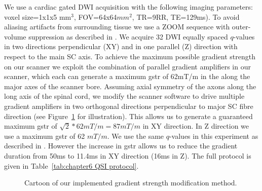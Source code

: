 We use a cardiac gated \gls{DWI} acquisition with the following imaging parameters: voxel size=1x1x5 mm$^3$, FOV=64x64$mm^2$, TR=9RR, TE=129ms). To avoid aliasing artifacts from surrounding tissue we use a ZOOM sequence with outer-volume suppression as described in \citep{Wilm:2007}. We acquire 32 \gls{DWI} equally spaced $q$-values in two directions perpendicular (XY) and in one parallel (Z) direction with respect to the main {\gls{SC}} axis. To achieve the maximum possible gradient strength on our scanner we exploit the combination of parallel gradient amplifiers in our scanner, which each can generate a maximum \gls{gstr} of 62mT/m in the along the major axes of the scanner bore. Assuming axial symmetry of the axons along the long axis of the spinal cord, we modify the scanner software to drive multiple gradient amplifiers in two orthogonal directions perpendicular to major SC fibre direction (see Figure~\ref{fig:chapter5_exp2_overplus_cartoon} for illustration). This allows us to generate a guaranteed maximum \gls{gstr} of $\sqrt{2} * 62mT/m = 87mT/m$ in XY direction.  In Z direction we use a maximum \gls{gstr} of 62 $mT/m$. We use the same $q$-values in this experiment as described in \citet{Farrell:2008}. However the increase in \gls{gstr} allows us to reduce the gradient duration from 50ms to 11.4ms in XY direction (16ms in Z). The full protocol is given in Table~\ref{tab:chapter6 QSI protocol}.


\begin{figure}
  \caption{Cartoon of our implemented gradient strength modification method.}
  \label{fig:chapter5_exp2_overplus_cartoon}
\end{figure}

